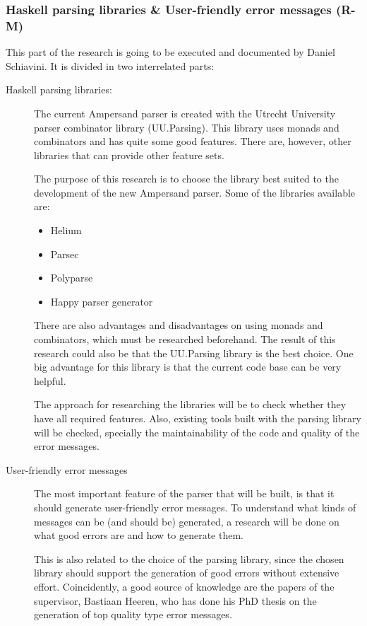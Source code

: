 \subsubsection{Haskell parsing libraries \& User-friendly error messages (R-M)}
This part of the research is going to be executed and documented by Daniel Schiavini.
It is divided in two interrelated parts:
\begin{description}
	\item [Haskell parsing libraries:]
	The current Ampersand parser is created with the Utrecht University parser combinator library (UU.Parsing).
	This library uses monads and combinators and has quite some good features.
	There are, however, other libraries that can provide other feature sets.
	
	The purpose of this research is to choose the library best suited to the development of the new Ampersand parser.
	Some of the libraries available are:
	\begin{itemize}
		\item Helium
		\item Parsec
		\item Polyparse
		\item Happy parser generator
	\end{itemize}
	There are also advantages and disadvantages on using monads and combinators, which must be researched beforehand.
	The result of this research could also be that the UU.Parsing library is the best choice.
	One big advantage for this library is that the current code base can be very helpful.

	The approach for researching the libraries will be to check whether they have all required features.
	Also, existing tools built with the parsing library will be checked, specially the maintainability of the code and quality of the error messages.

	\item [User-friendly error messages]
	The most important feature of the parser that will be built, is that it should generate user-friendly error messages.
	To understand what kinds of messages can be (and should be) generated, a research will be done on what good errors are and how to generate them.
	
	This is also related to the choice of the parsing library, since the chosen library should support the generation of good errors without extensive effort.
	Coincidently, a good source of knowledge are the papers of the supervisor, Bastiaan Heeren, who has done his PhD thesis on the generation of top quality type error messages\cite{heeren-error}.
\end{description}

